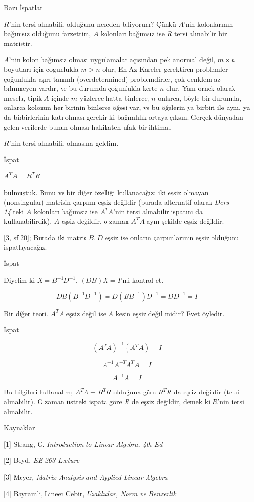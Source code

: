 \documentclass[12pt,fleqn]{article}\usepackage{../../common}
\begin{document}
Bazı İspatlar

$R$'nin tersi alınabilir olduğunu nereden biliyorum? Çünkü $A$'nin
kolonlarının bağımsız olduğunu farzettim, $A$ kolonları bağımsız ise
$R$ tersi alınabilir bir matristir. 

$A$'nin kolon bağımsız olması uygulamalar açısından pek anormal değil, $m
\times n$ boyutları için cogunlukla $m > n$ olur, En Az Kareler gerektiren
problemler çoğunlukla aşırı tanımlı (overdetermined) problemdirler, çok
denklem az bilinmeyen vardır, ve bu durumda çoğunlukla kerte $n$ olur. Yani
örnek olarak mesela, tipik $A$ içinde $m$ yüzlerce hatta binlerce, $n$
onlarca, böyle bir durumda, onlarca kolonun her birinin binlerce öğesi var,
ve bu öğelerin ya birbiri ile aynı, ya da birbirlerinin katı olması gerekir
ki bağımlılık ortaya çıksın. Gerçek dünyadan gelen verilerde bunun olması
hakikaten ufak bir ihtimal.

$R$'nin tersi alınabilir olmasına gelelim.

İspat

$A^TA = R^TR$

bulmuştuk. Bunu ve bir diğer özelliği kullanacağız: iki eşsiz olmayan
(nonsingular) matrisin çarpımı eşsiz değildir (burada alternatif olarak
{\em Ders 14}'teki $A$ kolonları bağımsız ise $A^TA$'nin tersi alınabilir
ispatını da kullanabilirdik). $A$ eşsiz değildir, o zaman $A^TA$ aynı
şekilde eşsiz değildir.

[3, sf 20]; Burada iki matris $B,D$ eşsiz ise onların çarpımlarının eşsiz
olduğunu ispatlayacağız. 

İspat

Diyelim ki $X=B^{-1}D^{-1}$, $(DB)X=I$'mi kontrol et.

$$ DB (B^{-1}D^{-1}) = D(BB^{-1})D^{-1} = DD^{-1} = I $$

Bir diğer teori. $A^TA$ eşsiz değil ise $A$ kesin eşsiz değil midir? Evet
öyledir.

İspat

$$ (A^TA)^{-1} (A^TA)= I $$

$$ A^{-1}A^{-T}A^TA = I$$

$$ A^{-1}A = I$$

Bu bilgileri kullanalım; $A^TA = R^TR$ olduğuna göre $R^TR$ da eşsiz
değildir (tersi alınabilir). O zaman üstteki ispata göre $R$ de eşsiz
değildir, demek ki $R$'nin tersi alınabilir.

Kaynaklar 

[1] Strang, G. {\em Introduction to Linear Algebra, 4th Ed}

[2] Boyd, {\em EE 263 Lecture}

[3] Meyer, {\em Matrix Analysis and Applied Linear Algebra}

[4] Bayramli, Lineer Cebir, {\em Uzaklıklar, Norm ve Benzerlik}
\end{document}
